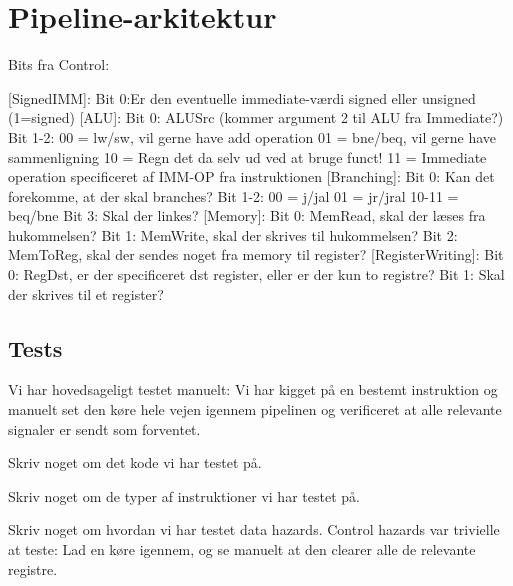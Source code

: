 \section{Pipeline-arkitektur}

Bits fra Control:

[SignedIMM]:
    Bit 0:Er den eventuelle immediate-værdi signed eller unsigned (1=signed)
[ALU]:
    Bit 0: ALUSrc (kommer argument 2 til ALU fra Immediate?)
    Bit 1-2: 00 = lw/sw, vil gerne have add operation
             01 = bne/beq, vil gerne have sammenligning
             10 = Regn det da selv ud ved at bruge funct!
             11 = Immediate operation specificeret af IMM-OP fra instruktionen
[Branching]:
    Bit 0: Kan det forekomme, at der skal branches?
    Bit 1-2: 00 = j/jal
             01 = jr/jral
             10-11 = beq/bne
    Bit 3: Skal der linkes?
[Memory]:
    Bit 0: MemRead, skal der læses fra hukommelsen?
    Bit 1: MemWrite, skal der skrives til hukommelsen?
    Bit 2: MemToReg, skal der sendes noget fra memory til register?
[RegisterWriting]:
    Bit 0: RegDst, er der specificeret dst register, eller er der kun to
           registre?
    Bit 1: Skal der skrives til et register?


\subsection{Tests}
Vi har hovedsageligt testet manuelt: Vi har kigget på en bestemt instruktion og
manuelt set den køre hele vejen igennem pipelinen og verificeret at alle
relevante signaler er sendt som forventet.

Skriv noget om det kode vi har testet på.

Skriv noget om de typer af instruktioner vi har testet på.

Skriv noget om hvordan vi har testet data hazards. Control hazards var trivielle
at teste: Lad en køre igennem, og se manuelt at den clearer alle de relevante registre.
